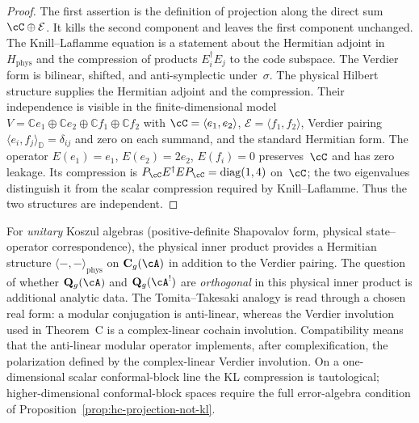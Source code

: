 \begin{proof}
The first assertion is the definition of projection along the direct
sum $\cC\oplus\mathcal E$.  It kills the second component and leaves
the first component unchanged.  The Knill--Laflamme equation is a
statement about the Hermitian adjoint in $H_{\mathrm{phys}}$ and the
compression of products $E_i^\dagger E_j$ to the code subspace.  The
Verdier form is bilinear, shifted, and anti-symplectic under~$\sigma$.
The physical Hilbert structure supplies the Hermitian adjoint and the
compression.  Their independence is visible in the finite-dimensional
model
$V=\mathbb C e_1\oplus\mathbb C e_2\oplus
\mathbb C f_1\oplus\mathbb C f_2$ with
$\cC=\langle e_1,e_2\rangle$,
$\mathcal E=\langle f_1,f_2\rangle$, Verdier pairing
$\langle e_i,f_j\rangle_{\mathbb D}=\delta_{ij}$ and zero on
each summand, and the standard Hermitian form.  The operator
$E(e_1)=e_1$, $E(e_2)=2e_2$, $E(f_i)=0$ preserves~$\cC$ and has zero
leakage.  Its compression is
$P_\cC E^\dagger E P_\cC=\operatorname{diag}(1,4)$ on~$\cC$; the two
eigenvalues distinguish it from the scalar compression required by
Knill--Laflamme.  Thus the two structures are independent.
\end{proof}

\begin{remark}
\label{rem:hc-unitary-physical-qec}
For \emph{unitary} Koszul algebras
\textup{(}positive-definite Shapovalov form, physical
state--operator correspondence\textup{)},
the physical inner product provides a Hermitian
structure $\langle -, - \rangle_{\mathrm{phys}}$
on $\mathbf{C}_g(\cA)$ in addition to the Verdier
pairing. The question of whether
$\mathbf{Q}_g(\cA)$ and $\mathbf{Q}_g(\cA^!)$ are
\emph{orthogonal} in this physical inner product
is additional analytic data.  The Tomita--Takesaki analogy is read
through a chosen real form: a modular conjugation is anti-linear,
whereas the Verdier involution used in Theorem~C is a complex-linear
cochain involution.  Compatibility means that the anti-linear modular
operator implements, after complexification, the polarization defined
by the complex-linear Verdier involution.
On a one-dimensional scalar conformal-block line the KL compression is
tautological; higher-dimensional conformal-block spaces require the
full error-algebra condition of Proposition~\ref{prop:hc-projection-not-kl}.
\end{remark}

